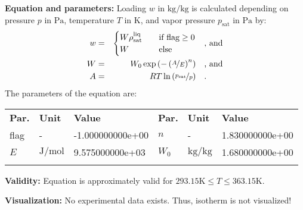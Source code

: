 \textbf{Equation and parameters:}
\newline
%
Loading $w$ in $\si{\kilogram\per\kilogram}$ is calculated depending on pressure $p$ in $\si{\pascal}$, temperature $T$ in $\si{\kelvin}$, and vapor pressure $p_\mathrm{sat}$ in $\si{\pascal}$ by:
%
\begin{equation*}
\begin{split}
w &=& \begin{cases} W \rho_\mathrm{sat}^{\mathrm{liq}} & \quad \text{if flag} \geq 0 \\ W & \quad \text{else} \end{cases} & \quad\text{, and} \\
W &=& W_0 \exp \left( - \left( \nicefrac{A}{E} \right) ^{n} \right) & \quad\text{, and} \\
A &=& R T \ln \left( \nicefrac{p_\mathrm{sat}}{p} \right) & \quad\text{.} \\
\end{split}
\end{equation*}
%
The parameters of the equation are:
%
\begin{longtable}[l]{lll|lll}
\toprule
\addlinespace
\textbf{Par.} & \textbf{Unit} & \textbf{Value} &	\textbf{Par.} & \textbf{Unit} & \textbf{Value} \\
\addlinespace
\midrule
\endhead

\bottomrule
\endfoot
\bottomrule
\endlastfoot
\addlinespace

flag & - & -1.000000000e+00 & $n$ & - & 1.830000000e+00 \\
$E$ & $\si{\joule\per\mole}$ & 9.575000000e+03 & $W_0$ & $\si{\kilogram\per\kilogram}$ & 1.680000000e+00 \\

\addlinespace\end{longtable}

\textbf{Validity:}
\newline
Equation is approximately valid for $293.15 \si{\kelvin} \leq T \leq 363.15 \si{\kelvin}$.
\newline

\textbf{Visualization:}
%
\newline
No experimental data exists. Thus, isotherm is not visualized!
%

\FloatBarrier
\newpage

